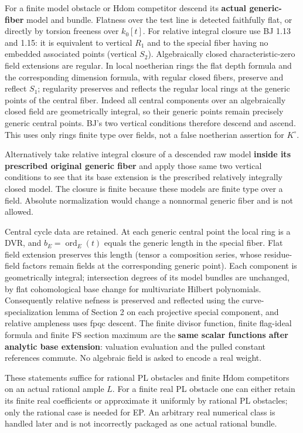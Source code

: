 \documentclass[
  10pt,
]{article}
\begin{document}
For a finite model obstacle or Hdom competitor descend its
\textbf{actual generic-fiber} model and bundle. Flatness over the test
line is detected faithfully flat, or directly by torsion freeness over
\(k_0[t]\). For relative integral closure use BJ 1.13 and 1.15: it is
equivalent to vertical \(R_1\) and to the special fiber having no
embedded associated points (vertical \(S_2\)). Algebraically closed
characteristic-zero field extensions are regular. In local noetherian
rings the flat depth formula and the corresponding dimension formula,
with regular closed fibers, preserve and reflect \(S_1\); regularity
preserves and reflects the regular local rings at the generic points of
the central fiber. Indeed all central components over an algebraically
closed field are geometrically integral, so their generic points remain
precisely generic central points. BJ's two vertical conditions therefore
descend and ascend. This uses only rings finite type over fields, not a
false noetherian assertion for \(K^\circ\).

Alternatively take relative integral closure of a descended raw model
\textbf{inside its prescribed original generic fiber} and apply those
same two vertical conditions to see that its base extension is the
prescribed relatively integrally closed model. The closure is finite
because these models are finite type over a field. Absolute
normalization would change a nonnormal generic fiber and is not allowed.

Central cycle data are retained. At each generic central point the local
ring is a DVR, and \(b_E=\operatorname{ord}_E(t)\) equals the generic
length in the special fiber. Flat field extension preserves this length
(tensor a composition series, whose residue-field factors remain fields
at the corresponding generic point). Each component is geometrically
integral; intersection degrees of its model bundles are unchanged, by
flat cohomological base change for multivariate Hilbert polynomials.
Consequently relative nefness is preserved and reflected using the
curve-specialization lemma of Section 2 on each projective special
component, and relative ampleness uses fpqc descent. The finite divisor
function, finite flag-ideal formula and finite FS section maximum are
the \textbf{same scalar functions after analytic base extension}:
valuation evaluation and the pulled constant references commute. No
algebraic field is asked to encode a real weight.

These statements suffice for rational PL obstacles and finite Hdom
competitors on an actual rational ample \(L\). For a finite real PL
obstacle one can either retain its finite real coefficients or
approximate it uniformly by rational PL obstacles; only the rational
case is needed for EP. An arbitrary real numerical class is handled
later and is not incorrectly packaged as one actual rational bundle.
\end{document}
